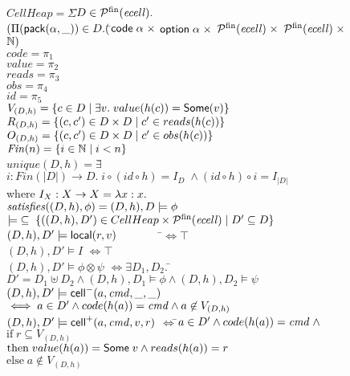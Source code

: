 \begin{figure}
\mbox{}
\begin{tabbing}
$CellHeap = \Sigma$\=$ D \in \mathcal{P}^{\mathrm{fin}}(\mathit{ecell}).$ \\
               \>$(\Pi (\mathsf{pack}({\alpha}, {\_})) \in D. ($\=${\mathsf{code}\;{\alpha}} \;\times$
                                         ${\mathsf{option}{\;\alpha}} \;\times$ 
                                         ${\mathcal{P}^{\mathrm{fin}}(\mathit{ecell})} \;\times$ 
                                         ${\mathcal{P}^{\mathrm{fin}}(\mathit{ecell})} \;\times$ 
                                         $\mathbb{N})$ \\[1em]
       

$code = \pi_1$ \\
$value = \pi_2$ \\
$reads = \pi_3$ \\
$obs = \pi_4$ \\
$id = \pi_5$ \\[1em]

$V_{(D, h)} = \{{{c \in D}\;|\;{\exists v.\; value(h(c)) = \mathsf{Some}(v)}}\}$ \\
$R_{(D, h)} = \{{{(c,c') \in D \times D}\;|\;{ c' \in reads(h(c)) }}\}$ \\
$O_{(D, h)} = \{{{(c,c') \in D \times D}\;|\;{ c' \in obs(h(c)) }}\}$ \\[1em]

$\mathit{Fin}(n) = \{{{ i \in \mathbb{N} }\;|\;{ i < n }}\}$ \\[1em]

$unique(D,h) = \exists$\=$i : Fin(|D|) \to D.\; i \circ (id \circ h) = I_D \; \land (id \circ h) \circ i = I_{|D|}$  \\
where $I_X : X \to X = \fun{x}{x}$ \\[1em]

$\mathit{satisfies}({(D,h)}, {\phi}) = (D,h), D \models \phi$ \\[1em]

$\models \;\subseteq\; \{{{((D,h), D') \in CellHeap \times \mathcal{P}^{\mathrm{fin}}(\mathit{ecell})}\;|\;{D' \subseteq D}}\}$ \\[0.5em]

$(D,h), D' \models \mathsf{local}({r}, {v}) \qquad \qquad$\=$\iff \top$ \\
$(D,h), D' \models I$                            \>$\iff \top$ \\
$(D,h), D' \models \phi \otimes \psi$            \>$\iff \exists D_1, D_2.\;$\=$D' = D_1 \uplus D_2 
                                                      \land (D,h), D_1 \models \phi
                                                      \land (D,h), D_2 \models \psi$ \\
$(D,h), D' \models \mathsf{cell}^{-}({a}, {\mathit{cmd}}, {\_}, {\_})$               \>$\iff a \in D' \land code(h(a)) = \mathit{cmd} \land a \not \in V_{(D,h)}$ \\
$(D,h), D' \models \mathsf{cell}^{+}({a}, {\mathit{cmd}}, {v}, {r})$         \>$\iff $\=$ a \in D' \land code(h(a)) = \mathit{cmd} \;\land$ \\
\>      \>$\mathrm{if}\;r \subseteq V_{(D,h)}$ \\
\>      \>$\mathrm{then}\;value(h(a)) = \mathsf{Some}\;v \land reads(h(a)) = r$ \\
\>      \>$\mathrm{else}\;a \not\in V_{(D,h)}$\\[1em]
 


\end{tabbing}
\end{figure}
